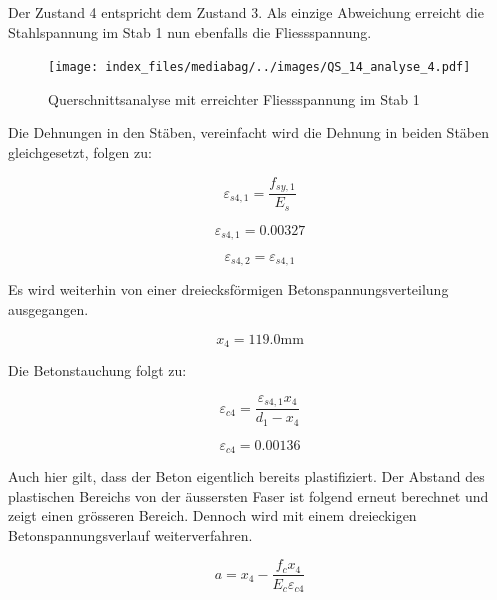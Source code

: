 \documentclass[
  12pt,
  letterpaper,
  egregdoesnotlikesansseriftitles]{scrreprt}
\begin{document}
Der Zustand 4 entspricht dem Zustand 3. Als einzige Abweichung erreicht
die Stahlspannung im Stab 1 nun ebenfalls die Fliessspannung.

\begin{figure}[H]

{\centering \texttt{[image: index\_files/mediabag/../images/QS\_14\_analyse\_4.pdf]}

}

\caption{\label{fig-qs5_sv14}Querschnittsanalyse mit erreichter
Fliessspannung im Stab 1}

\end{figure}

Die Dehnungen in den Stäben, vereinfacht wird die Dehnung in beiden
Stäben gleichgesetzt, folgen zu:

\begin{equation}\varepsilon_{s4,1} = \frac{f_{sy,1}}{E_{s}}\end{equation}

\begin{equation}\varepsilon_{s4,1} = 0.00327\end{equation}

\begin{equation}\varepsilon_{s4,2} = \varepsilon_{s4,1}\end{equation}

Es wird weiterhin von einer dreiecksförmigen Betonspannungsverteilung
ausgegangen.

\begin{equation}x_{4} = 119.0 \text{mm}\end{equation}

Die Betonstauchung folgt zu:

\begin{equation}\varepsilon_{c4} = \frac{\varepsilon_{s4,1} x_{4}}{d_{1} - x_{4}}\end{equation}

\begin{equation}\varepsilon_{c4} = 0.00136\end{equation}

Auch hier gilt, dass der Beton eigentlich bereits plastifiziert. Der
Abstand des plastischen Bereichs von der äussersten Faser ist folgend
erneut berechnet und zeigt einen grösseren Bereich. Dennoch wird mit
einem dreieckigen Betonspannungsverlauf weiterverfahren.

\begin{equation}a = x_{4} - \frac{f_{c} x_{4}}{E_{c} \varepsilon_{c4}}\end{equation}
\end{document}
